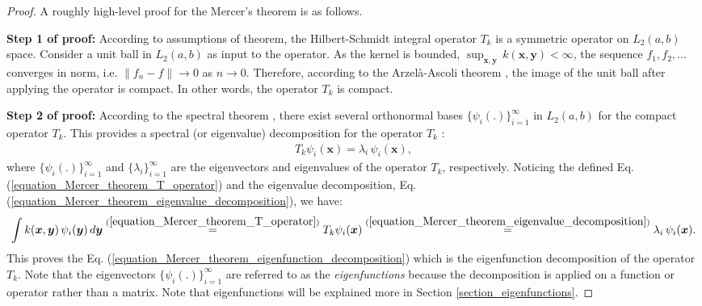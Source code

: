\documentclass[lang=cn,10pt]{gorgeousnbook}
\numberwithin{equation}{section}%
\numberwithin{figure}{section}%
\begin{document}
\begin{proof}
A roughly high-level proof for the Mercer's theorem is as follows. 



\textbf{Step 1 of proof:}
According to assumptions of theorem, the Hilbert-Schmidt integral operator $T_k$ is a symmetric operator on $L_2(a,b)$ space. 
Consider a unit ball in $L_2(a,b)$ as input to the operator.
As the kernel is bounded, $\sup_{\boldsymbol{x}, \boldsymbol{y}}\, k(\boldsymbol{x}, \boldsymbol{y}) < \infty$, the sequence $f_1, f_2, \dots$ converges in norm, i.e. $\|f_n - f\| \rightarrow 0$ as $n \rightarrow 0$. 
Therefore, according to the Arzel{\`a}-Ascoli theorem \cite{arzela1895sulle}, the image of the unit ball after applying the operator is compact. In other words, the operator $T_k$ is compact. 

\textbf{Step 2 of proof:}
According to the spectral theorem \cite{hawkins1975cauchy}, there exist several orthonormal bases $\{\psi_i(.)\}_{i=1}^\infty$ in $L_2(a,b)$ for the compact operator $T_k$. This provides a spectral (or eigenvalue) decomposition for the operator $T_k$ \cite{ghojogh2019eigenvalue}:
\begin{align}\label{equation_Mercer_theorem_eigenvalue_decomposition}
T_k \psi_i(\boldsymbol{x}) = \lambda_i\, \psi_i(\boldsymbol{x}),
\end{align}
where $\{\psi_i(.)\}_{i=1}^\infty$ and $\{\lambda_i\}_{i=1}^\infty$ are the eigenvectors and eigenvalues of the operator $T_k$, respectively. 
Noticing the defined Eq. (\ref{equation_Mercer_theorem_T_operator}) and the eigenvalue decomposition, Eq. (\ref{equation_Mercer_theorem_eigenvalue_decomposition}), we have: 
\begin{align}
\int k(\boldsymbol{x}, \boldsymbol{y})\, \psi_i(\boldsymbol{y})\, d\boldsymbol{y} \overset{(\ref{equation_Mercer_theorem_T_operator})}{=} T_k \psi_i(\boldsymbol{x})  \overset{(\ref{equation_Mercer_theorem_eigenvalue_decomposition})}{=} \lambda_i\, \psi_i(\boldsymbol{x}).
\end{align}
This proves the Eq. (\ref{equation_Mercer_theorem_eigenfunction_decomposition}) which is the eigenfunction decomposition of the operator $T_k$. Note that the eigenvectors $\{\psi_i(.)\}_{i=1}^\infty$ are referred to as the \textit{eigenfunctions} because the decomposition is applied on a function or operator rather than a matrix. 
Note that eigenfunctions will be explained more in Section \ref{section_eigenfunctions}.


\end{proof}
\end{document}
